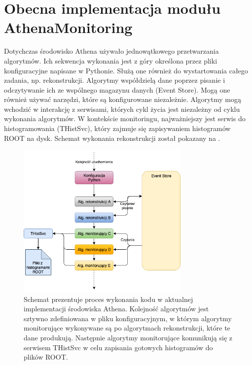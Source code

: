 \section{Obecna implementacja modułu AthenaMonitoring}
Dotychczas środowisko Athena używało jednowątkowego przetwarzania algorytmów. 
Ich sekwencja wykonania jest z góry określona przez pliki konfiguracyjne napisane w Pythonie. 
Służą one również do wystartowania całego zadania, np. rekonstrukcji. 
Algorytmy współdzielą dane poprzez pisanie i odczytywanie ich ze wspólnego magazynu danych (Event Store). 
Mogą one również używać narzędzi, które są konfigurowane niezależnie. 
Algorytmy mogą wchodzić w interakcję z serwisami, których cykl życia jest niezależny od cyklu wykonania algorytmów.
W kontekście monitoringu, najważniejszy jest serwis do histogramowania (THistSvc), który zajmuje się zapisywaniem histogramów ROOT na dysk. 
Schemat wykonania rekonstrukcji został pokazany na .

\begin{figure}[!ht]
\centering
\includegraphics[width=0.75\textwidth]{img/old_flow.png}
\caption{
Schemat prezentuje proces wykonania kodu w aktualnej implementacji środowiska Athena. 
Kolejność algorytmów jest sztywno zdefiniowana w pliku konfiguracyjnym, w którym algorytmy monitorujące wykonywane są po algorytmach rekonstrukcji, które te dane produkują. 
Następnie algorytmy monitorujące komunikują się z serwisem THistSvc w celu zapisania gotowych histogramów do plików ROOT.
}
\label{fig:athena:oldFlow}
\end{figure}

